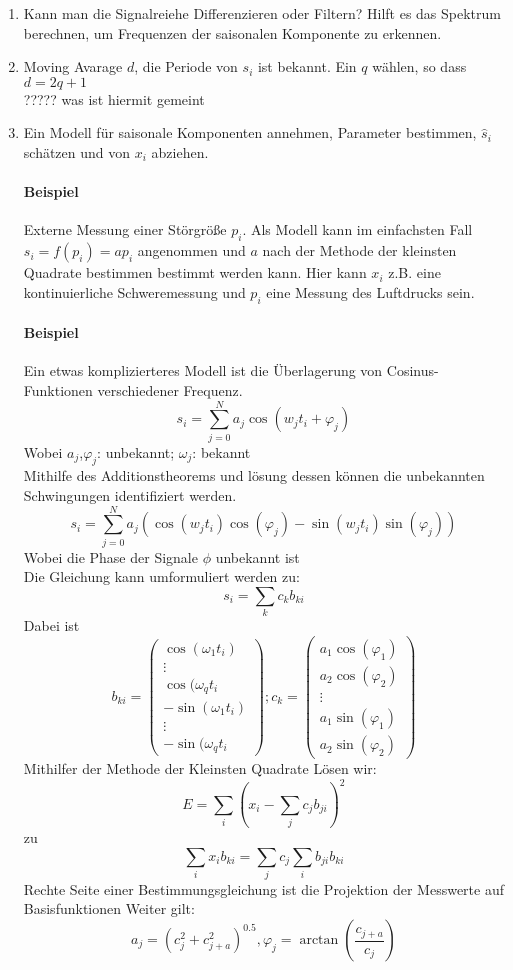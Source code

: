 \begin{enumerate}
\item Kann man die Signalreiehe Differenzieren oder Filtern? Hilft es das Spektrum berechnen, um Frequenzen der saisonalen Komponente zu erkennen.

\item Moving Avarage $d$, die Periode von $s_i$ ist bekannt. Ein $q$ wählen, so dass $d=2q+1$\\
{\color{red}????? was ist hiermit gemeint}

\item Ein Modell für saisonale Komponenten annehmen, Parameter bestimmen, $\hat s_i$ schätzen und von $x_i$ abziehen.

\paragraph{Beispiel} Externe Messung einer Störgröße $p_i$. Als Modell kann im einfachsten Fall $s_i=f(p_i) = ap_i$ angenommen und $a$ nach der Methode der kleinsten Quadrate bestimmen bestimmt werden kann. Hier kann $x_i$ z.B. eine kontinuierliche Schweremessung und $p_i$ eine Messung des Luftdrucks sein. 

\paragraph{Beispiel} Ein etwas komplizierteres Modell ist die Überlagerung von Cosinus-Funktionen verschiedener Frequenz.
\[
s_i=\sum\limits_{j=0}^N a_j \cos(w_jt_i+\varphi_j)
\]
{\small Wobei $a_j$,$\varphi_j$: unbekannt; $\omega_j$: bekannt}\\
Mithilfe des Additionstheorems und lösung dessen können die unbekannten Schwingungen identifiziert werden.
\[
s_i=\sum\limits_{j=0}^N a_j (\cos(w_jt_i)\cos(\varphi_j) - \sin(w_jt_i) \sin(\varphi_j))
\]
{\small Wobei die Phase der Signale $\phi$ unbekannt ist}\\
Die Gleichung kann umformuliert werden zu:
\[
s_i=\sum\limits_k c_k b_{ki}
\]
Dabei ist
\[
b_{ki}=
\begin{pmatrix}
\cos(\omega_1t_i)\\
\vdots \\
\cos(\omega_qt_i \\
-\sin(\omega_1t_i)\\
\vdots \\
-\sin(\omega_qt_i
\end{pmatrix}
; c_k=
\begin{pmatrix} 
a_1 \cos(\varphi_1)\\
a_2 \cos(\varphi_2)\\
\vdots\\
a_1 \sin(\varphi_1) \\
a_2 \sin(\varphi_2)
\end{pmatrix}
\]
Mithilfer der Methode der Kleinsten Quadrate Lösen wir:
\[
E = \sum\limits_i (x_i- \sum\limits_j c_j b_{ji})^2
\]
zu
\[
\sum\limits_i x_i b_{ki} = \sum\limits_j c_j\sum\limits_i b_{ji}b_{ki}
\]
Rechte Seite einer Bestimmungsgleichung ist die Projektion der Messwerte auf Basisfunktionen
Weiter gilt:
\[
a_j=(c_j^2+c_{j+a}^2)^{0.5}, \varphi_j=\arctan(\frac{c_{j+a}}{c_j})
\]


\end{enumerate}
